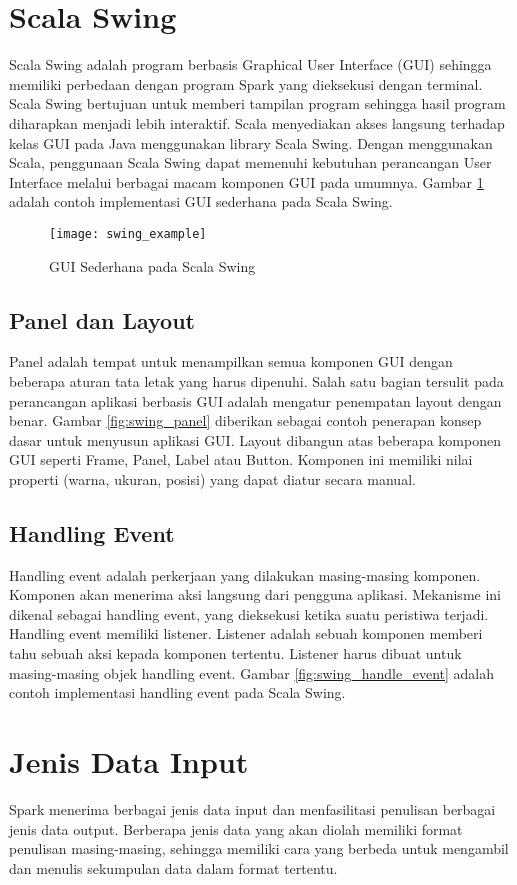 \section{Scala Swing} 
Scala Swing adalah program berbasis Graphical User Interface (GUI) sehingga memiliki perbedaan dengan program Spark yang dieksekusi dengan terminal. Scala Swing bertujuan untuk memberi tampilan program sehingga hasil program diharapkan menjadi lebih interaktif. Scala menyediakan akses langsung terhadap kelas GUI pada Java menggunakan library Scala Swing.  Dengan menggunakan Scala, penggunaan Scala Swing dapat memenuhi kebutuhan perancangan User Interface melalui berbagai macam komponen GUI pada umumnya. Gambar \ref{fig:swing_example} adalah contoh implementasi GUI sederhana pada Scala Swing.

\begin{figure}[H]
	\centering
	\texttt{[image: swing\_example]}
	\caption{GUI Sederhana pada Scala Swing}
	\label{fig:swing_example}
\end{figure}


\subsection{Panel dan Layout}
Panel adalah tempat untuk menampilkan semua komponen GUI dengan beberapa aturan tata letak yang harus dipenuhi. Salah satu bagian tersulit pada perancangan aplikasi berbasis GUI adalah mengatur penempatan layout dengan benar. Gambar \ref{fig:swing_panel} diberikan sebagai contoh penerapan konsep dasar untuk menyusun aplikasi GUI. Layout dibangun atas beberapa komponen GUI seperti Frame, Panel, Label atau Button. Komponen ini memiliki nilai properti (warna, ukuran, posisi) yang dapat diatur secara manual.

\subsection{Handling Event}
Handling event adalah perkerjaan yang dilakukan masing-masing komponen. Komponen akan menerima aksi langsung dari pengguna aplikasi. Mekanisme ini dikenal sebagai handling event, yang dieksekusi ketika suatu peristiwa terjadi. Handling event memiliki listener. Listener adalah sebuah komponen memberi tahu sebuah aksi kepada komponen tertentu. Listener harus dibuat untuk masing-masing objek handling event. Gambar \ref{fig:swing_handle_event} adalah contoh implementasi handling event pada Scala Swing.

\section{Jenis Data Input}
Spark menerima berbagai jenis data input dan menfasilitasi penulisan berbagai jenis data output. Berberapa jenis data yang akan diolah memiliki format penulisan masing-masing, sehingga memiliki cara yang berbeda untuk mengambil dan menulis sekumpulan data dalam format tertentu. 

